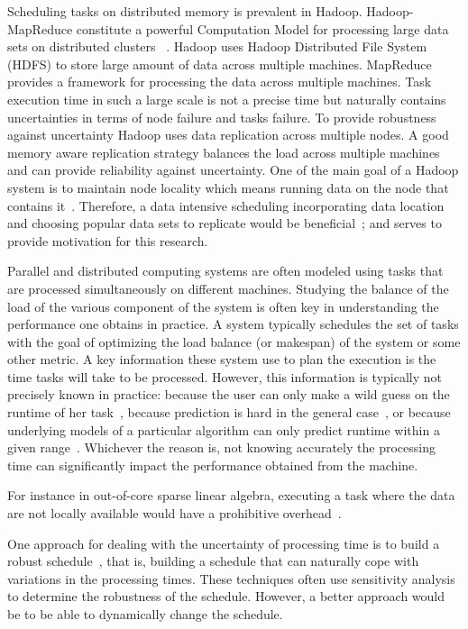 Scheduling tasks on distributed memory is prevalent in Hadoop. Hadoop-MapReduce constitute a powerful Computation Model for processing large data sets on distributed clusters~\cite{DBLP:journals/corr/abs-1207-0780} . Hadoop uses Hadoop Distributed File System (HDFS) to store large amount of data across multiple machines. MapReduce provides a framework for processing the data across multiple machines. Task execution time in such a large scale is not a precise time but naturally contains uncertainties in terms of node failure and tasks failure. To provide robustness against uncertainty Hadoop uses data replication across multiple nodes. A good memory aware replication strategy balances the load across multiple machines and can provide reliability against uncertainty. One of the main goal of a Hadoop system is to maintain node locality which means running data on the node that contains it~\cite{Zaharia:EECS-2009-55}. Therefore, a data intensive scheduling incorporating data location  and choosing popular data sets to replicate would be beneficial~\cite{Guo:2012:IDL:2310096.2310222}; and serves to provide motivation for this research.


 Parallel and distributed computing systems are often modeled using
 tasks that are processed simultaneously on different
 machines. Studying the balance of the load of the various component of
 the system is often key in understanding the performance one obtains
 in practice. A system typically schedules the set of tasks with the
 goal of optimizing the load balance (or makespan) of the system or
 some other metric. A key information these system use to plan the
 execution is the time tasks will take to be processed. However, this
 information is typically not precisely known in practice: because the
 user can only make a wild guess on the runtime of her
 task~\cite{Luong2008}, because prediction is hard in the general
 case~\cite{Wilhelm2008}, or because underlying models of a particular
 algorithm can only predict runtime within a given
 range~\cite{Erlebacher14-ICS}. Whichever the reason is, not knowing
 accurately the processing time can significantly impact the
 performance obtained from the machine.
 
 For instance in out-of-core sparse
 linear algebra, executing a task where the data are not locally
 available would have a prohibitive
 overhead~\cite{Zhou12-Cluster,Zhou12-P2S2}.
 
 One approach for dealing with the uncertainty of processing time is to
 build a robust schedule~\cite{cj09c,Gatto07,
   Davenport_slack-basedtechniques}, that is, building a schedule that
 can naturally cope with variations in the processing times. These
 techniques often use sensitivity analysis to determine the robustness
 of the schedule. However, a better approach would be to be able to
 dynamically change the schedule. 
 
